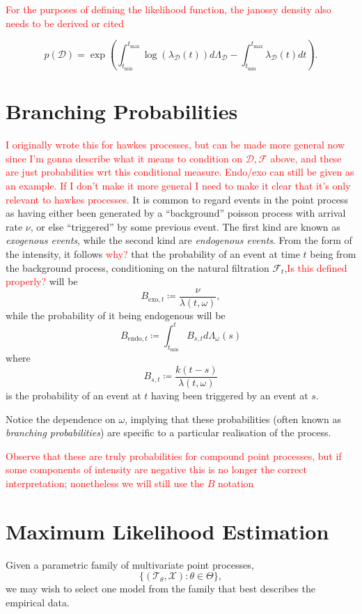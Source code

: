 \documentclass[honours,12pt]{unswthesis}
\numberwithin{equation}{section}
\begin{document}
\textcolor{red}{For the purposes of defining the likelihood function, the janossy density also needs to be derived or cited}

$$p(\mathcal{D}) = \exp\left(\int_{t_\mathrm{min}}^{t_\mathrm{max}}\log(\lambda_\mathcal{D}(t))d\Lambda_\mathcal{D}-\int_{t_\mathrm{min}}^{t_\mathrm{max}}\lambda_\mathcal{D}(t) dt\right).$$

\section{Branching Probabilities}
\textcolor{red}{I originally wrote this for hawkes processes, but can be made more general now since I'm gonna describe what it means to condition on $\mathcal{D},\mathcal{F}$ above, and these are just probabilities wrt this conditional measure. Endo/exo can still be given as an example. If I don't make it more general I need to make it clear that it's only relevant to hawkes processes.}
It is common to regard events in the point process as having either been generated by a ``background'' poisson process with arrival rate $\nu$, or else ``triggered'' by some previous event. The first kind are known as \textit{exogenous events}, while the second kind are \textit{endogenous events}. From the form of the intensity, it follows \textcolor{red}{why?} that the probability of an event at time $t$ being from the background process, conditioning on the natural filtration $\mathcal{F}_t$,\textcolor{red}{Is this defined properly?} will be
$$B_{\mathrm{exo},t}\coloneq \frac{\nu}{\lambda(t,\omega)},$$
while the probability of it being endogenous will be
$$B_{\mathrm{endo},t}\coloneq \int_{t_\mathrm{min}}^t B_{s,t}d\Lambda_\omega(s)$$
where
$$B_{s,t} \coloneq \frac{k(t-s)}{\lambda(t,\omega)}$$
is the probability of an event at $t$ having been triggered by an event at $s$.

Notice the dependence on $\omega$, implying that these probabilities (often known as \textit{branching probabilities}) are specific to a particular realisation of the process.

\textcolor{red}{Observe that these are truly probabilities for compound point processes, but if some components of intensity are negative this is no longer the correct interpretation; nonetheless we will still use the $B$ notation}
\section{Maximum Likelihood Estimation}
Given a parametric family of multivariate point processes,
$$\{(\mathcal{T}_\theta,\mathcal{X}) : \theta\in\Theta\},$$
we may wish to select one model from the family that best describes the empirical data.
\end{document}
